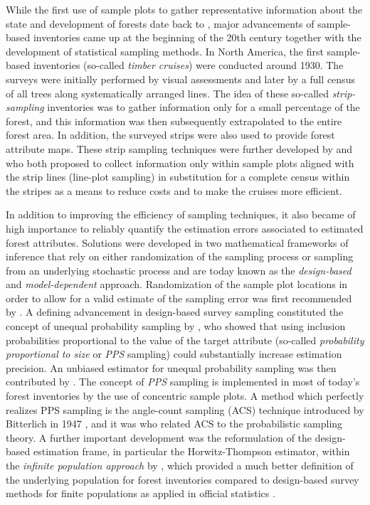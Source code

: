 While the first use of sample plots to gather representative information about the state and development of forests date back to \citet{hartig1795}, major advancements of sample-based inventories came up at the beginning of the 20th century together with the development of statistical sampling methods. In North America, the first sample-based inventories (so-called \textit{timber cruises}) were conducted around 1930. The surveys were initially performed by visual assessments and later by a full census of all trees along systematically arranged lines. The idea of these so-called \textit{strip-sampling} inventories was to gather information only for a small percentage of the forest, and this information was then subsequently extrapolated to the entire forest area. In addition, the surveyed strips were also used to provide forest attribute maps. These strip sampling techniques were further developed by \citet{goodspeed1934} and \citet{langballe1938} who both proposed to collect information only within sample plots aligned with the strip lines (line-plot sampling) in substitution for a complete census within the stripes as a means to reduce costs and to make the cruises more efficient.\par 

In addition to improving the efficiency of sampling techniques, it also became of high importance to reliably quantify the estimation errors associated to estimated forest attributes. Solutions were developed in two mathematical frameworks of inference that rely on either randomization of the sampling process or sampling from an underlying stochastic process and are today known as the \textit{design-based} and \textit{model-dependent} approach. Randomization of the sample plot locations in order to allow for a valid estimate of the sampling error was first recommended by \citet{hasel1938}. A defining advancement in design-based survey sampling constituted the concept of unequal probability sampling by \citet{hansen1943}, who showed that using inclusion probabilities proportional to the value of the target attribute (so-called \textit{probability proportional to size} or \textit{PPS} sampling) could substantially increase estimation precision. An unbiased estimator for unequal probability sampling was then contributed by \citet{horvitz1952}. The concept of \textit{PPS} sampling is implemented in most of today's forest inventories by the use of concentric sample plots. A method which perfectly realizes PPS sampling is the angle-count sampling (ACS) technique introduced by Bitterlich in 1947 \citep{bitterlich1984}, and it was \citet{grosenbaugh1958} who related ACS to the probabilistic sampling theory. A further important development was the reformulation of the design-based estimation frame, in particular the Horwitz-Thompson estimator, within the \textit{infinite population approach} by \citet{mandallaz2008}, which provided a much better definition of the underlying population for forest inventories compared to design-based survey methods for finite populations as applied in official statistics \citep[e.g.]{sarndal2003}.\par

